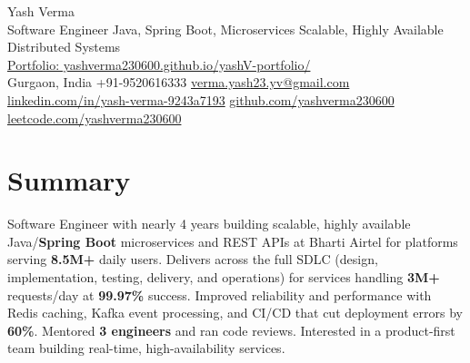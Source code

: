 \documentclass[letterpaper,11pt]{article}
\begin{document}
\begin{center}
  {\Huge Yash Verma} \\
  \small Software Engineer \textbar{} Java, Spring Boot, Microservices \textbar{} Scalable, Highly Available Distributed Systems \\
  \href{https://yashverma230600.github.io/yashV-portfolio/}{Portfolio: yashverma230600.github.io/yashV-portfolio/} \\
  \vspace{8pt}
  \small
  Gurgaon, India \textbar{}
  +91-9520616333 \textbar{}
  \href{mailto:verma.yash23.yv@gmail.com}{verma.yash23.yv@gmail.com} \textbar{}
  \href{https://www.linkedin.com/in/yash-verma-9243a7193/}{linkedin.com/in/yash-verma-9243a7193} \textbar{}
  \href{https://github.com/yashverma230600}{github.com/yashverma230600} \textbar{}
  \href{https://leetcode.com/yashverma230600}{leetcode.com/yashverma230600}
  \vspace{-8pt}
\end{center}

\section{Summary}
\begin{itemize}[leftmargin=0.15in, label={}]
  \small{\item{
    Software Engineer with nearly 4 years building scalable, highly available Java/\textbf{Spring Boot} microservices and REST APIs at Bharti Airtel for platforms serving \textbf{8.5M+} daily users. Delivers across the full SDLC (design, implementation, testing, delivery, and operations) for services handling \textbf{3M+} requests/day at \textbf{99.97\%} success. Improved reliability and performance with Redis caching, Kafka event processing, and CI/CD that cut deployment errors by \textbf{60\%}. Mentored \textbf{3 engineers} and ran code reviews. Interested in a product-first team building real-time, high-availability services.
  }}
\end{itemize}
\vspace{-8pt}

\end{document}
